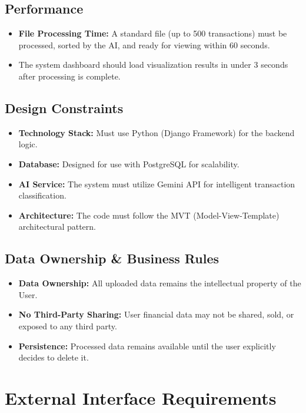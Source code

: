 \subsection{Performance}
\begin{itemize}
	\item \textbf{File Processing Time:} A standard file (up to 500 transactions) must be processed, sorted by the AI, and ready for viewing within 60 seconds.
	\item The system dashboard should load visualization results in under 3 seconds after processing is complete.
\end{itemize}

\subsection{Design Constraints}
\begin{itemize}
	\item \textbf{Technology Stack:} Must use Python (Django Framework) for the backend logic.
	\item \textbf{Database:} Designed for use with PostgreSQL for scalability.
	\item \textbf{AI Service:} The system must utilize Gemini API for intelligent transaction classification.
	\item \textbf{Architecture:} The code must follow the MVT (Model-View-Template) architectural pattern.
\end{itemize}

\subsection{Data Ownership \& Business Rules}
\begin{itemize}
	\item \textbf{Data Ownership:} All uploaded data remains the intellectual property of the User.
	\item \textbf{No Third-Party Sharing:} User financial data may not be shared, sold, or exposed to any third party.
	\item \textbf{Persistence:} Processed data remains available until the user explicitly decides to delete it.
\end{itemize}

\section{External Interface Requirements}

